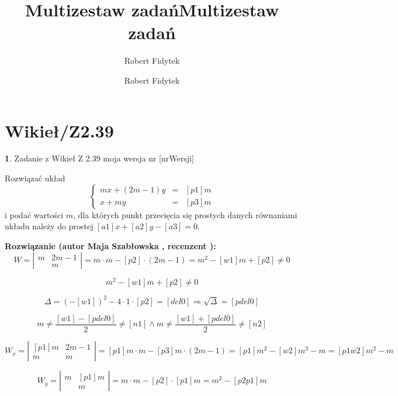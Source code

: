 \documentclass[12pt, a4paper]{article}
\title{Multizestaw zadań}
\author{Robert Fidytek}
\date{}\documentclass[12pt, a4paper]{article}
\title{Multizestaw zadań}
\author{Robert Fidytek}
\date{}
\theoremstyle{definition} %
\newtheorem{zad}{}
\theoremstyle{definition} %
\newtheorem{zad}{}
\newcommand{\kategoria}[1]{\section{#1}} %
\newcommand{\zadStart}[1]{\begin{zad}#1\newline} %
\newcommand{\zadStop}{\end{zad}}   %
\newcommand{\rozwStart}[2]{\noindent \textbf{Rozwiązanie (autor #1 , recenzent #2): }\newline} %
\begin{document}
\maketitle


\kategoria{Wikieł/Z2.39}
\zadStart{Zadanie z Wikieł Z 2.39  moja wersja nr [nrWersji]}



Rozwiązać układ
$$\left\{\begin{array}{rcl}
mx+(2m-1)y&=&[p1]m\\
[p2]x+my&=&[p3]m
\end{array} \right.$$
i podać wartości $m$, dla których punkt przecięcia się prostych danych równaniami układu należy do prostej $[a1]x+[a2]y-[a3]=0$.
\zadStop
\rozwStart{Maja Szabłowska}{}
$$W=\left| \begin{array}{lccr} m & 2m-1 \\ [p2] & m \end{array}\right| = m\cdot m - [p2]\cdot (2m-1)=m^{2}-[w1]m+[p2] \neq 0$$

$$m^{2}-[w1]m+[p2] \neq 0 $$

$$\Delta=(-[w1])^{2}-4\cdot 1 \cdot [p2]=[del0] \Rightarrow \sqrt{\Delta}=[pdel0]$$

$$m\neq \frac{[w1]-[pdel0]}{2}\neq [n1] \land m\neq \frac{[w1]+[pdel0]}{2} \neq [n2]$$

$$W_{x}=\left| \begin{array}{lccr} [p1]m & 2m-1 \\ [p3]m & m \end{array}\right| = [p1]m\cdot m -[p3]m\cdot(2m-1)=[p1]m^{2}-[w2]m^{2}-m=[p1w2]m^{2}-m$$

$$W_{y}=\left| \begin{array}{lccr} m & [p1]m \\ [p2] & m \end{array}\right| = m\cdot m - [p2]\cdot[p1]m=m^{2}-[p2p1]m$$
\end{document}
